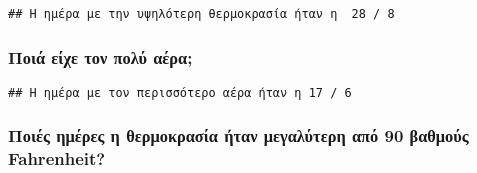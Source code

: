 \documentclass[
]{article}
\newenvironment{Shaded}{\begin{snugshade}}{\end{snugshade}}
\newcommand{\FunctionTok}[1]{\textcolor[rgb]{0.13,0.29,0.53}{\textbf{#1}}}
\newcommand{\NormalTok}[1]{#1}
\newcommand{\OtherTok}[1]{\textcolor[rgb]{0.56,0.35,0.01}{#1}}
\newcommand{\SpecialCharTok}[1]{\textcolor[rgb]{0.81,0.36,0.00}{\textbf{#1}}}
\newcommand{\StringTok}[1]{\textcolor[rgb]{0.31,0.60,0.02}{#1}}
\begin{document}
\begin{verbatim}
## Η ημέρα με την υψηλότερη θερμοκρασία ήταν η  28 / 8
\end{verbatim}

\hypertarget{ux3c0ux3bfux3b9ux3ac-ux3b5ux3afux3c7ux3b5-ux3c4ux3bfux3bd-ux3c0ux3bfux3bbux3cd-ux3b1ux3adux3c1ux3b1}{%
\subsubsection{Ποιά είχε τον πολύ
αέρα;}\label{ux3c0ux3bfux3b9ux3ac-ux3b5ux3afux3c7ux3b5-ux3c4ux3bfux3bd-ux3c0ux3bfux3bbux3cd-ux3b1ux3adux3c1ux3b1}}

\begin{Shaded}
\end{Shaded}

\begin{verbatim}
## Η ημέρα με τον περισσότερο αέρα ήταν η 17 / 6
\end{verbatim}

\hypertarget{ux3c0ux3bfux3b9ux3adux3c2-ux3b7ux3bcux3adux3c1ux3b5ux3c2-ux3b7-ux3b8ux3b5ux3c1ux3bcux3bfux3baux3c1ux3b1ux3c3ux3afux3b1-ux3aeux3c4ux3b1ux3bd-ux3bcux3b5ux3b3ux3b1ux3bbux3cdux3c4ux3b5ux3c1ux3b7-ux3b1ux3c0ux3cc-90-ux3b2ux3b1ux3b8ux3bcux3bfux3cdux3c2-fahrenheit}{%
\subsubsection{Ποιές ημέρες η θερμοκρασία ήταν μεγαλύτερη από 90 βαθμούς
Fahrenheit?}\label{ux3c0ux3bfux3b9ux3adux3c2-ux3b7ux3bcux3adux3c1ux3b5ux3c2-ux3b7-ux3b8ux3b5ux3c1ux3bcux3bfux3baux3c1ux3b1ux3c3ux3afux3b1-ux3aeux3c4ux3b1ux3bd-ux3bcux3b5ux3b3ux3b1ux3bbux3cdux3c4ux3b5ux3c1ux3b7-ux3b1ux3c0ux3cc-90-ux3b2ux3b1ux3b8ux3bcux3bfux3cdux3c2-fahrenheit}}
\end{document}
